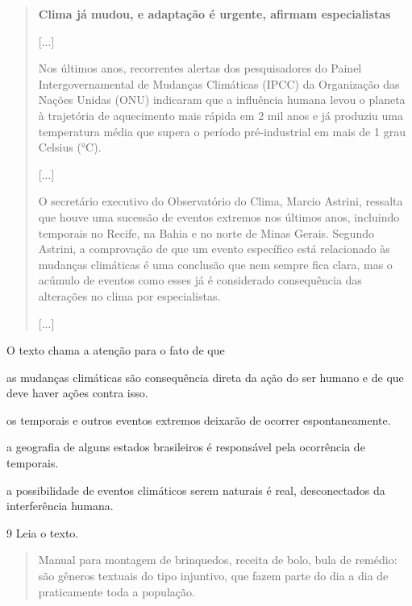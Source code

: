 \begin{quote}
\textbf{Clima já mudou, e adaptação é urgente, afirmam especialistas}

{[}...{]}

Nos últimos anos, recorrentes alertas dos pesquisadores do Painel
Intergovernamental de Mudanças Climáticas (IPCC) da Organização das
Nações Unidas (ONU) indicaram que a influência humana levou o planeta à
trajetória de aquecimento mais rápida em 2 mil anos e já produziu uma
temperatura média que supera o período pré-industrial em mais de 1 grau
Celsius (°C).

{[}...{]}

O secretário executivo do Observatório do Clima, Marcio Astrini,
ressalta que houve uma sucessão de eventos extremos nos últimos anos,
incluindo temporais no Recife, na Bahia e no norte de Minas Gerais.
Segundo Astrini, a comprovação de que um evento específico está
relacionado às mudanças climáticas é uma conclusão que nem sempre fica
clara, mas o acúmulo de eventos como esses já é considerado consequência
das alterações no clima por especialistas.

{[}...{]}

\end{quote}

O texto chama a atenção para o fato de que

\begin{escolha}
\item as mudanças climáticas são consequência direta da ação do ser humano e de que deve haver ações contra isso.

\item os temporais e outros eventos extremos deixarão de ocorrer espontaneamente.

\item a geografia de alguns estados brasileiros é responsável pela ocorrência de temporais.

\item a possibilidade de eventos climáticos serem naturais é real, desconectados da interferência humana.
\end{escolha}

\pagebreak
\num{9} Leia o texto.

\begin{quote}
Manual para montagem de brinquedos, receita de bolo, bula de remédio:
são gêneros textuais do tipo injuntivo, que fazem parte do dia a dia de
praticamente toda a população.
\end{quote}

